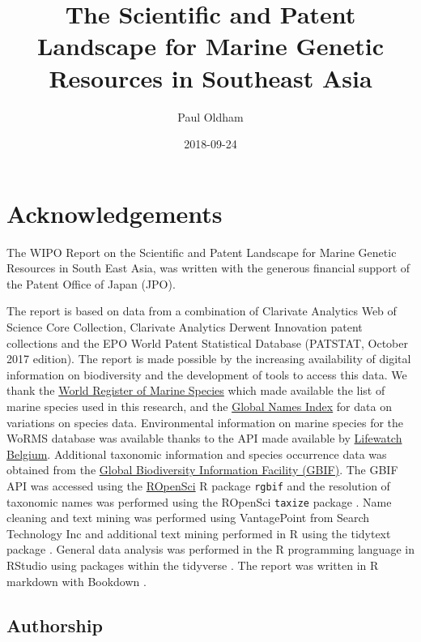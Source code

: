 \documentclass[]{book}
\title{The Scientific and Patent Landscape for Marine Genetic Resources in
Southeast Asia}
\author{Paul Oldham}
\date{2018-09-24}
\theoremstyle{definition}
\theoremstyle{definition}
\theoremstyle{definition}
\theoremstyle{remark}
\begin{document}
\maketitle

{
\setcounter{tocdepth}{1}
\tableofcontents
}
\hypertarget{acknowledgements}{%
\chapter{Acknowledgements}\label{acknowledgements}}

The WIPO Report on the Scientific and Patent Landscape for Marine
Genetic Resources in South East Asia, was written with the generous
financial support of the Patent Office of Japan (JPO).

The report is based on data from a combination of Clarivate Analytics
Web of Science Core Collection, Clarivate Analytics Derwent Innovation
patent collections and the EPO World Patent Statistical Database
(PATSTAT, October 2017 edition). The report is made possible by the
increasing availability of digital information on biodiversity and the
development of tools to access this data. We thank the
\href{http://www.marinespecies.org/}{World Register of Marine Species}
which made available the list of marine species used in this research,
and the \href{http://gni.globalnames.org/}{Global Names Index} for data
on variations on species data. Environmental information on marine
species for the WoRMS database was available thanks to the API made
available by
\href{http://www.lifewatch.be/data-services/?cache=1521050271}{Lifewatch
Belgium}. Additional taxonomic information and species occurrence data
was obtained from the \href{https://www.gbif.org/}{Global Biodiversity
Information Facility (GBIF)}. The GBIF API was accessed using the
\href{https://ropensci.org/}{ROpenSci} R package \texttt{rgbif} and the
resolution of taxonomic names was performed using the ROpenSci
\texttt{taxize} package \citep{R-rgbif, R-taxize}. Name cleaning and
text mining was performed using VantagePoint from Search Technology Inc
and additional text mining performed in R using the tidytext package
\citep{R-tidytext}. General data analysis was performed in the R
programming language in RStudio using packages within the tidyverse
\citep{R-base, R-tidyverse}. The report was written in R markdown with
Bookdown \citep{R-rmarkdown, R-bookdown}.

\hypertarget{authorship}{%
\section{Authorship}\label{authorship}}
\end{document}
